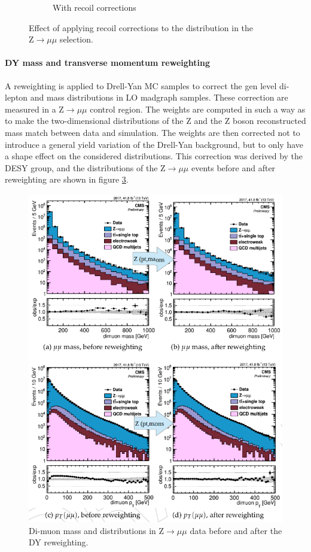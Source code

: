 \begin{figure}
\begin{subfigure}[b]{0.5\textwidth}
  \caption{\label{fig:recoil2} With recoil corrections}
\end{subfigure}
\caption{Effect of applying recoil corrections to the \MET distribution in the $\mathrm{Z}\rightarrow \mu\mu$ selection.}
\label{fig:recoilcorr}
\end{figure}

\paragraph{DY mass and transverse momentum reweighting} A reweighting is applied to Drell-Yan MC samples to correct the gen level di-lepton \pt and mass distributions in LO madgraph samples. These correction are measured in a $\mathrm{Z}\rightarrow \mu\mu$ control region. The weights are computed in such a way as to make the two-dimensional distributions of the $\mathrm{Z}$ \pt and the Z boson reconstructed mass match between data and simulation. The weights are then corrected not to introduce a general yield variation of the Drell-Yan background, but to only have a shape effect on the considered distributions. This correction was derived by the DESY group, and the \MET distributions of the $\mathrm{Z}\rightarrow \mu\mu$ events before and after reweighting are shown in figure \ref{fig:DYreweight}.

\begin{figure}
    \centering
    \includegraphics[width=.7\textwidth]{Images/DYreweight.png}
    \caption{Di-muon mass and \pt distributions in $\mathrm{Z}\rightarrow \mu\mu$ data before and after the DY \pt reweighting.}
    \label{fig:DYreweight}
\end{figure}

